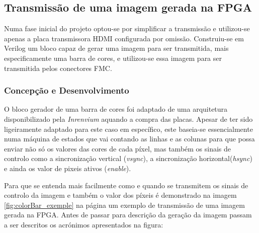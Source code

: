 \subsection{Transmissão de uma imagem gerada na FPGA} \label{subsub:planA}

Numa fase inicial do projeto optou-se por simplificar a transmissão e utilizou-se apenas a placa transmissora HDMI configurada por omissão. Construiu-se em Verilog um bloco capaz de gerar uma imagem para ser transmitida, mais especificamente uma barra de cores, e utilizou-se essa imagem para ser transmitida pelos conectores FMC.

\subsubsection*{Concepção e Desenvolvimento}

O bloco gerador de uma barra de cores foi adaptado de uma arquitetura disponibilizado pela \textit{Inrenvium} aquando a compra das placas. Apesar de ter sido ligeiramente adaptado para este caso em específico, este baseia-se essencialmente numa máquina de estados que vai contando as linhas e as colunas para que possa enviar não só os valores das cores de cada píxel, mas também os sinais de controlo como a sincronização vertical (\textit{vsync}), a sincronização horizontal(\textit{hsync}) e ainda os valor de pixeis ativos (\textit{enable}).

Para que se entenda mais facilmente como e quando se transmitem os sinais de controlo da imagem e também o valor dos píxeis é demonstrado na imagem \ref{fig:colorBar_exemple} na página \pageref{fig:colorBar_exemple} um exemplo de transmissão de uma imagem gerada na FPGA. Antes de passar para descrição da geração da imagem passam a ser descritos os acrónimos apresentados na figura:

